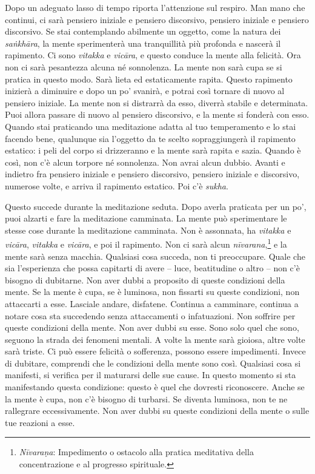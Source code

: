 Dopo un adeguato lasso di tempo riporta l'attenzione sul respiro. Man
mano che continui, ci sarà pensiero iniziale e pensiero discorsivo,
pensiero iniziale e pensiero discorsivo. Se stai contemplando abilmente
un oggetto, come la natura dei \emph{saṅkhāra}, la mente sperimenterà
una tranquillità più profonda e nascerà il rapimento. Ci sono
\emph{vitakka} e \emph{vicāra}, e questo conduce la mente alla felicità.
Ora non ci sarà pesantezza alcuna né sonnolenza. La mente non sarà cupa
se si pratica in questo modo. Sarà lieta ed estaticamente rapita. Questo
rapimento inizierà a diminuire e dopo un po' svanirà, e potrai così
tornare di nuovo al pensiero iniziale. La mente non si distrarrà da
esso, diverrà stabile e determinata. Puoi allora passare di nuovo al
pensiero discorsivo, e la mente si fonderà con esso. Quando stai
praticando una meditazione adatta al tuo temperamento e lo stai facendo
bene, qualunque sia l'oggetto da te scelto sopraggiungerà il rapimento
estatico: i peli del corpo si drizzeranno e la mente sarà rapita e
sazia. Quando è così, non c'è alcun torpore né sonnolenza. Non avrai
alcun dubbio. Avanti e indietro fra pensiero iniziale e pensiero
discorsivo, pensiero iniziale e discorsivo, numerose volte, e arriva il
rapimento estatico. Poi c'è \emph{sukha}.

Questo succede durante la meditazione seduta. Dopo averla praticata per
un po', puoi alzarti e fare la meditazione camminata. La mente può
sperimentare le stesse cose durante la meditazione camminata. Non è
assonnata, ha \emph{vitakka} e \emph{vicāra}, \emph{vitakka} e
\emph{vicāra}, e poi il rapimento. Non ci sarà alcun
\emph{nīvarana},\footnote{\emph{Nīvaraṇa}: Impedimento o ostacolo alla
  pratica meditativa della concentrazione e al progresso spirituale.} e
la mente sarà senza macchia. Qualsiasi cosa succeda, non ti preoccupare.
Quale che sia l'esperienza che possa capitarti di avere -- luce,
beatitudine o altro -- non c'è bisogno di dubitarne. Non aver dubbi a
proposito di queste condizioni della mente. Se la mente è cupa, se è
luminosa, non fissarti su queste condizioni, non attaccarti a esse.
Lasciale andare, disfatene. Continua a camminare, continua a notare cosa
sta succedendo senza attaccamenti o infatuazioni. Non soffrire per
queste condizioni della mente. Non aver dubbi su esse. Sono solo quel
che sono, seguono la strada dei fenomeni mentali. A volte la mente sarà
gioiosa, altre volte sarà triste. Ci può essere felicità o sofferenza,
possono essere impedimenti. Invece di dubitare, comprendi che le
condizioni della mente sono così. Qualsiasi cosa si manifesti, si
verifica per il maturarsi delle sue cause. In questo momento si sta
manifestando questa condizione: questo è quel che dovresti riconoscere.
Anche se la mente è cupa, non c'è bisogno di turbarsi. Se diventa
luminosa, non te ne rallegrare eccessivamente. Non aver dubbi su queste
condizioni della mente o sulle tue reazioni a esse.

